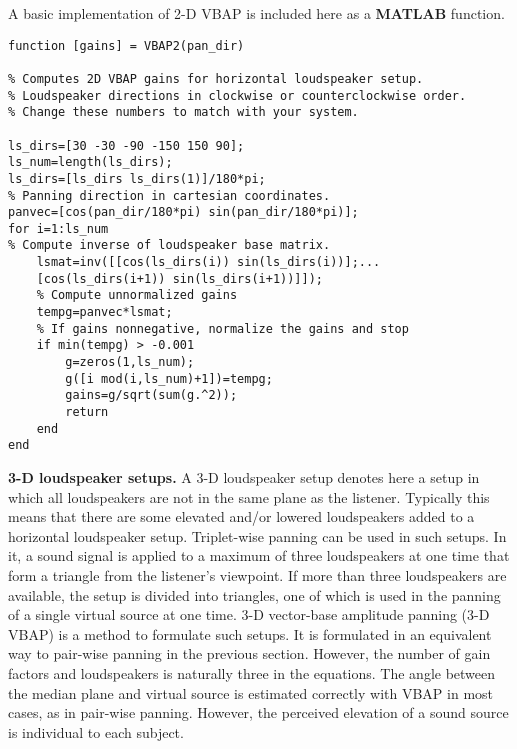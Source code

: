 \documentclass[10pt,a4paper,oneside]{article}
\begin{document}
A basic implementation of 2-D VBAP is included here as a {\bfseries MATLAB} function.
\begin{lstlisting}
function [gains] = VBAP2(pan_dir)

% Computes 2D VBAP gains for horizontal loudspeaker setup.  
% Loudspeaker directions in clockwise or counterclockwise order.
% Change these numbers to match with your system.

ls_dirs=[30 -30 -90 -150 150 90];
ls_num=length(ls_dirs);
ls_dirs=[ls_dirs ls_dirs(1)]/180*pi;
% Panning direction in cartesian coordinates.
panvec=[cos(pan_dir/180*pi) sin(pan_dir/180*pi)];
for i=1:ls_num
% Compute inverse of loudspeaker base matrix.
	lsmat=inv([[cos(ls_dirs(i)) sin(ls_dirs(i))];...
	[cos(ls_dirs(i+1)) sin(ls_dirs(i+1))]]);
	% Compute unnormalized gains
	tempg=panvec*lsmat;
	% If gains nonnegative, normalize the gains and stop
	if min(tempg) > -0.001
		g=zeros(1,ls_num);
		g([i mod(i,ls_num)+1])=tempg;
		gains=g/sqrt(sum(g.^2));
		return
	end
end
\end{lstlisting}
 {\bfseries 3-D loudspeaker setups.} A 3-D loudspeaker setup denotes here a setup in which all loudspeakers are not in the same plane as the listener. Typically this means that there are some elevated and/or lowered loudspeakers added to a horizontal loudspeaker setup. Triplet-wise panning can be used in such setups. In it, a sound signal is applied to a maximum of three loudspeakers at one time that form a triangle from the listener’s viewpoint. If more than three loudspeakers are available, the setup is divided into triangles, one of which is used in the panning of a single virtual source at one time. 3-D vector-base amplitude panning (3-D VBAP) is a method to formulate such setups. It is formulated in an equivalent way to pair-wise panning in the previous section. However, the number of gain factors and loudspeakers is naturally three in the equations. The angle between the median plane and virtual source is estimated correctly with VBAP in most cases, as in pair-wise panning. However, the perceived elevation of a sound source is individual to each subject.
 
\end{document}
